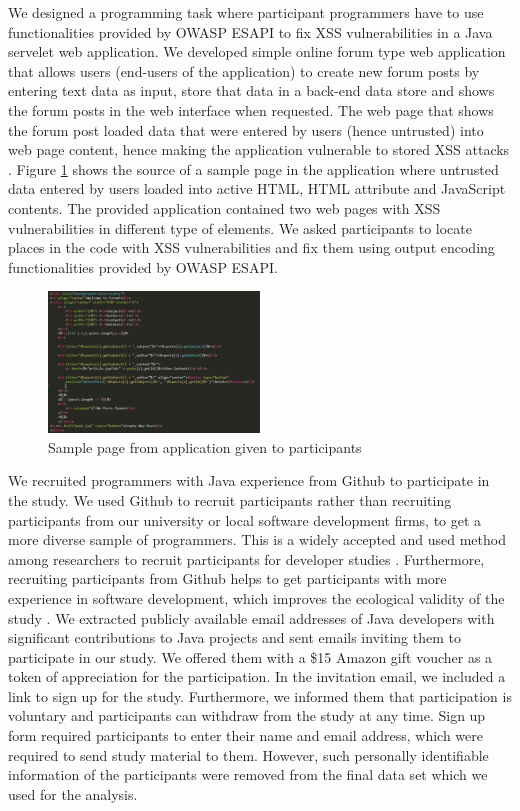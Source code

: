 \documentclass[10pt]{article}
\begin{document}
We designed a programming task where participant programmers have to use functionalities provided by OWASP ESAPI to fix XSS vulnerabilities in a Java servelet web application. We developed simple online forum type web application that allows users (end-users of the application) to create new forum posts by entering text data as input, store that data in a back-end data store and shows the forum posts in the web interface when requested. The web page that shows the forum post loaded data that were entered by users (hence untrusted) into web page content, hence making the application vulnerable to stored XSS attacks \cite{owasp10xss}. Figure \ref{code1} shows the source of a sample page in the application where untrusted data entered by users loaded into active HTML, HTML attribute and JavaScript contents. The provided application contained two web pages with XSS vulnerabilities in different type of elements. We asked participants to locate places in the code with XSS vulnerabilities and fix them using output encoding functionalities provided by OWASP ESAPI.

\begin{figure}[htbp]
\centerline{\includegraphics[width=0.5\textwidth]{code1.png}}
\caption{Sample page from application given to participants}
\label{code1}
\end{figure}

We recruited programmers with Java experience from Github
to participate in the study. We used Github to recruit participants rather than recruiting participants from our university or local software development firms, to get a more diverse sample of programmers. This is a widely accepted and used method among researchers to recruit participants for developer studies \cite{acar, acargit}. Furthermore, recruiting participants from Github helps to get participants with more experience in software development, which improves the ecological validity of the study \cite{acargit}. We extracted publicly available email addresses of Java developers with significant contributions to Java projects and sent emails inviting them to participate in our study. We offered them with a \$15 Amazon gift voucher as a token of appreciation for the participation. In the invitation email, we included a link to sign up for the study. Furthermore, we informed them that participation is voluntary and participants can withdraw from the study at any time. Sign up form required participants to enter their name and
email address, which were required to send study material to
them. However, such personally identifiable information of
the participants were removed from the final data set which
we used for the analysis. 
\end{document}
